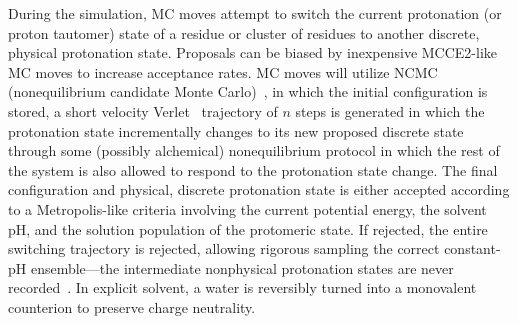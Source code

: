 \documentclass[11pt]{article}
\begin{document}

During the simulation, MC moves attempt to switch the current protonation (or proton tautomer) state of a residue or cluster of residues to another discrete, physical protonation state.
Proposals can be biased by inexpensive MCCE2-like MC moves to increase acceptance rates.
MC moves will utilize NCMC (nonequilibrium candidate Monte Carlo)~\cite{ncmc}, in which the initial configuration is stored, a short velocity Verlet~\cite{swope:jcp:1982:velocity-verlet} trajectory of $n$ steps is generated in which the protonation state incrementally changes to its new proposed discrete state through some (possibly alchemical) nonequilibrium protocol in which the rest of the system is also allowed to respond to the protonation state change.
The final configuration and physical, discrete protonation state is either accepted according to a Metropolis-like criteria involving the current potential energy, the solvent pH, and the solution population of the protomeric state.
If rejected, the entire switching trajectory is rejected, allowing rigorous sampling the correct constant-pH ensemble---the intermediate nonphysical protonation states are never recorded~\cite{ncmc}.
In explicit solvent, a water is reversibly turned into a monovalent counterion to preserve charge neutrality.

\eject
\end{document}
